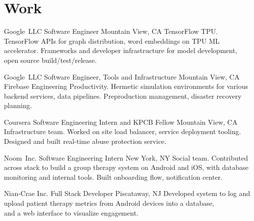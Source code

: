 \documentclass[11pt,letterpaper]{moderncv}
\begin{document}
\maketitle

\section{Work}

        {Google~LLC}
        {Software Engineer}
        {Mountain View, CA}
        {}
        {TensorFlow TPU. TensorFlow APIs for graph distribution, word embeddings on TPU ML accelerator. Frameworks and developer infrastructure for model development, open source build/test/release. \\}

        {Google~LLC}
        {Software Engineer, Tools and Infrastructure}
        {Mountain View, CA}
        {}
        {Firebase Engineering Productivity. Hermetic simulation environments for various backend services, data pipelines. Preproduction management, disaster recovery planning.\\}

        {Coursera}
        {Software Engineering Intern and KPCB Fellow}
        {Mountain View, CA}
        {}
        {Infrastructure team. Worked on site load balancer, service deployment tooling. \\Designed and built real-time abuse protection service. \\}

        {Noom~Inc.}
        {Software Engineering Intern}
        {New York, NY}
        {}
        {Social team. Contributed across stack to build a group therapy system on Android and iOS, with database monitoring and internal tools. Built onboarding flow, notification center.\\}

        {Nian-Crae Inc.}
        {Full Stack Developer}
        {Piscataway, NJ}
        {}
        {Developed system to log and upload patient therapy metrics from Android devices into a database,\\and a web interface to visualize engagement.\\}

\end{document}
